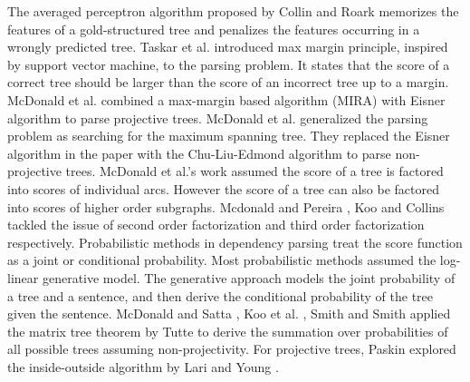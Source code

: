 The averaged perceptron algorithm proposed by Collin and Roark \cite{collins2004incremental} memorizes the features of a gold-structured tree and penalizes the features occurring in a wrongly predicted tree. Taskar et al. \cite{taskar2004max} introduced max margin principle, inspired by support vector machine, to the parsing problem. It states that the score of a correct tree should be larger than the score of an incorrect tree up to a margin. McDonald et al. \cite{mcdonald2005online} combined a max-margin based algorithm (MIRA) with Eisner algorithm to parse projective trees. McDonald et al. \cite{mcdonald2005non} generalized the parsing problem as searching for the maximum spanning tree. They replaced the Eisner algorithm in the paper \cite{mcdonald2005online} with the Chu-Liu-Edmond algorithm to parse non-projective trees. McDonald et al.'s work \cite{mcdonald2005non} assumed the score of a tree is factored into scores of individual arcs. However the score of a tree can also be factored into scores of higher order subgraphs. Mcdonald and Pereira \cite{mcdonald2006online}, Koo and Collins \cite{koo2010efficient} tackled the issue of second order factorization and third order factorization respectively. Probabilistic methods in dependency parsing treat the score function as a joint or conditional probability. Most probabilistic methods assumed the log-linear generative model. The generative approach models the joint probability of a tree and a sentence, and then derive the conditional probability of the tree given the sentence. McDonald and Satta \cite{mcdonald2007complexity}, Koo et al. \cite{koo2007structured}, Smith and Smith \cite{smith2007probabilistic} applied the matrix tree theorem by Tutte \cite{tutte} to derive the summation over probabilities of all possible trees assuming non-projectivity. For projective trees, Paskin \cite{paskin2002grammatical} explored the inside-outside algorithm by Lari and Young \cite{lari1990estimation}.

